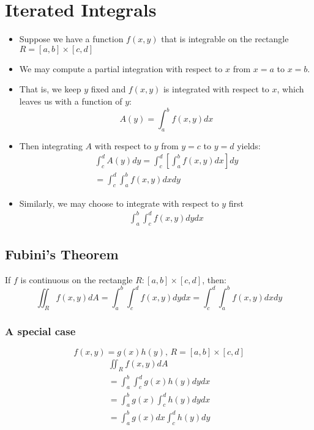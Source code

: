 \documentclass[12pt]{article}
\begin{document}
\section{Iterated Integrals}
\begin{itemize}
	\item Suppose we have a function \(f(x,y)\) that is integrable on the rectangle \(R= [a,b]\times [c,d]	\) 
	\item We may compute a partial integration with respect to \(x\) from \(x=a\) to \(x = b\).
	\item That is, we keep \(y \) fixed and \(f(x,y)\) is integrated with respect to \(x\), which leaves us with a function of \(y\):
		\[
			A(y) = \int_{a}^{b} f(x,y)dx
		\]
	\item Then integrating \(A\) with respect to \(y\) from \(y= c\) to \( y = d\) yields:
		\begin{align*}
			\int_{c}^{d} A(y)dy = \int_{c}^{d} [\int_{a}^{b} f(x,y)dx]dy\\
			= \int_{c}^{d} \int_{a}^{b} f(x,y)dxdy
		\end{align*}
	\item Similarly, we may choose to integrate with respect to \(y\) first
		\begin{align*}
			\label{eq:Respect to Y}
			\int_{a}^{b} \int_{c}^{d} f(x,y)dydx
		\end{align*}
\end{itemize}

\subsection{Fubini's Theorem}
If \(f\) is continuous on the rectangle \(R:[a,b] \times  [c,d]	\), then:
\[
	\iint_{R}f(x,y)dA = \int_{a}^{b} \int_{c}^{d} f(x,y)dydx = \int_{c}^{d} \int_{a}^{b} f(x,y)dxdy 
\] 

\subsubsection{A special case}
\[
	f(x,y) = g(x)h(y)\text{, }R = [a,b]\times [c,d]
\]
\begin{align*}
	\label{eq:Special Case}
	\iint_{R}f(x,y)dA\\
	= \int_{a}^{b} \int_{c}^{d} g(x)h(y)dydx\\
	=\int_{a}^{b} g(x) \int_{c}^{d} h(y)dydx\\
	=\int_{a}^{b} g(x)dx	\int_{c}^{d} h(y)dy
\end{align*}
\end{document}
